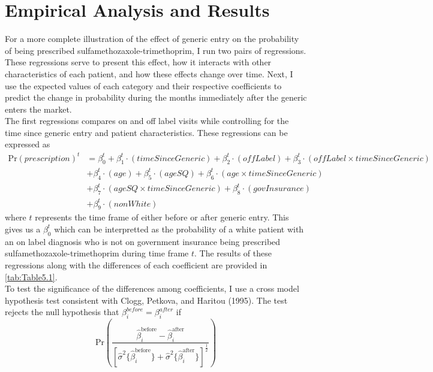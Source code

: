 \chapter{Empirical Analysis and Results}
For a more complete illustration of the effect of generic entry on the probability of being prescribed sulfamethozaxole-trimethoprim, I run two pairs of regressions. These regressions serve to present this effect, how it interacts with other characteristics of each patient, and how these effects change over time. Next, I use the expected values of each category and their respective coefficients to predict the change in probability during the months immediately after the generic enters the market. \\
\indent The first regressions compares on and off label visits while controlling for the time since generic entry and patient characteristics. These regressions can be expressed as
\begin{equation}
\begin{split}
    \text{Pr}(prescription)^t & = \beta^t_0 + \beta^t_1\cdot(timeSinceGeneric) + \beta_2^t\cdot(offLabel) + \beta_3^t\cdot(offLabel\times timeSinceGeneric)\\
    & + \beta_4^t\cdot(age) + \beta_5^t\cdot(ageSQ)  + \beta_6^t\cdot(age\times timeSinceGeneric)\\
    & + \beta_7^t\cdot(ageSQ\times timeSinceGeneric)  + \beta_8^t\cdot(govInsurance)\\
    & + \beta_9^t\cdot(nonWhite)
\end{split}
\end{equation}
where $t$ represents the time frame of either before or after generic entry. This gives us a $\beta_0^t$ which can be interpretted as the probability of a white patient with an on label diagnosis who is not on government insurance being prescribed sulfamethozaxole-trimethoprim during time frame $t$. The results of these regressions along with the differences of each coefficient are provided in \autoref{tab:Table5.1}.\\
\indent To test the significance of the differences among coefficients, I use a cross model hypothesis test consistent with Clogg, Petkova, and Haritou (1995)\cite{clogg_statistical_1995}. The test rejects the null hypothesis that $\beta_i^{before} = \beta_i^{after}$ if 
\begin{equation}
\text{Pr}(\frac{\hat{\beta}^\text{before}_i - \hat{\beta}^\text{after}_i}{[\hat{\sigma}^2\{\hat{\beta}^\text{before}_i\} + \hat{\sigma}^2\{\hat{\beta}^\text{after}_i\}]^\frac{1}{2}})
\end{equation}
